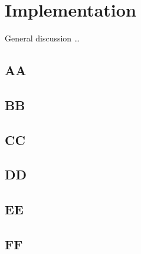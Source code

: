 \chapter{Implementation}

General discussion \ldots

\section{AA}
\section{BB}
\section{CC}
\section{DD}
\section{EE}
\section{FF}
